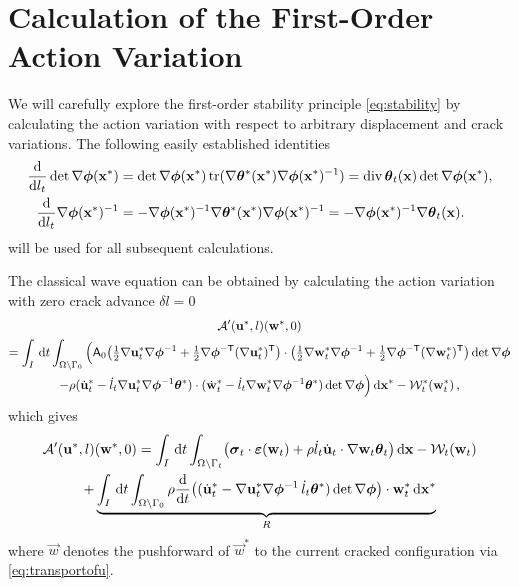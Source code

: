 \section*{Calculation of the First-Order Action Variation}
We will carefully explore the first-order stability principle \eqref{eq:stability} by calculating the action variation with respect to arbitrary displacement and crack variations. The following easily established identities
\begin{align*}
\frac{\md}{\md l_t}\det\nabla\philt(\vec{x}^*) &= \det\nabla\philt(\vec{x}^*)\tr(\nabla\vtheta^*(\vec{x}^*)\nabla\philt(\vec{x}^*)^{-1})=\div\vtheta_t(\vec{x})\det\nabla\philt(\vec{x}^*), \\
\frac{\md}{\md l_t}\nabla\philt(\vec{x}^*)^{-1} &= -\nabla\philt(\vec{x}^*)^{-1}\nabla\vtheta^*(\vec{x}^*)\nabla\philt(\vec{x}^*)^{-1}=-\nabla\philt(\vec{x}^*)^{-1}\nabla\vtheta_t(\vec{x}).
\end{align*}
will be used for all subsequent calculations.

The classical wave equation can be obtained by calculating the action variation with zero crack advance $\delta l=0$
\begin{multline*}
\mathcal{A}'(\vec{u}^*,l)(\vec{w}^*,0) \\
=\int_I\D{t}\int_\domaini\Big(\tens{A}_0\bigl({\textstyle\frac{1}{2}}\nabla\vec{u}_t^*\nabla\philt^{-1}+{\textstyle\frac{1}{2}}\nabla\philt^{-\mathsf{T}}(\nabla\vec{u}_t^*)^\mT\bigr)\cdot\bigl({\textstyle\frac{1}{2}}\nabla\vec{w}_t^*\nabla\philt^{-1}+{\textstyle\frac{1}{2}}\nabla\philt^{-\mathsf{T}}(\nabla\vec{w}_t^*)^\mT\bigr)\det\nabla\philt \\
-\rho(\dot{\vec{u}}_t^*-\dot{l}_t\nabla\vec{u}_t^*\nabla\philt^{-1}\vtheta^*)\cdot(\dot{\vec{w}}_t^*-\dot{l}_t\nabla\vec{w}_t^*\nabla\philt^{-1}\vtheta^*)\det\nabla\philt\Big)\dxx-\mathcal{W}_t^*(\vec{w}^*_t)\,,
\end{multline*}
which gives
\begin{multline} \label{eq:aprime1}
\mathcal{A}'(\vec{u}^*,l)(\vec{w}^*,0)=\int_I\D{t}\int_\domaint\bigl(\sig_t\cdot\eps(\vec{w}_t)+\rho\dot{l}_t\dot{\vec{u}}_t\cdot\nabla\vec{w}_t\vtheta_t\bigr)\dx-\mathcal{W}_t(\vec{w}_t) \\
+\underbrace{\int_I\D{t}\int_\domaini\rho\frac{\md}{\md t}\bigl((\dot{\vec{u}}_t^*-\nabla\vec{u}_t^*\nabla\philt^{-1}\,\dot{l}_t\vtheta^*)\det\nabla\philt\bigr)\cdot\vec{w}_t^*\dxx}_R
\end{multline}
where $\vec{w}$ denotes the pushforward of $\vec{w}^*$ to the current cracked configuration via \eqref{eq:transportofu}.

